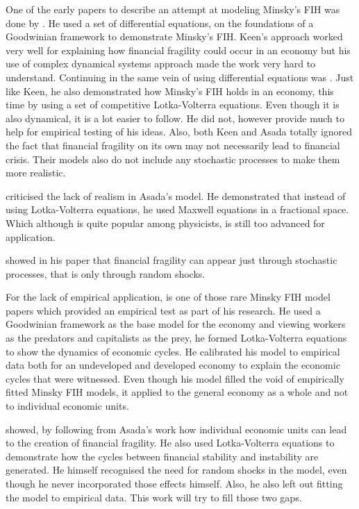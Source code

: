 \documentclass[12pt, a4paper]{article}
\begin{document}
	One of the early papers to describe an attempt at modeling Minsky's FIH was done by . He used a set of differential equations, on the foundations of a Goodwinian framework to demonstrate Minsky's FIH. Keen's approach worked very well for explaining how financial fragility could occur in an economy but his use of complex dynamical systems approach made the work very hard to understand. Continuing in the same vein of using differential equations was . Just like Keen, he also demonstrated how Minsky's FIH holds in an economy, this time by using a set of competitive Lotka-Volterra equations. Even though it is also dynamical, it is a lot easier to follow. He did not, however provide much to help for empirical testing of his ideas. Also, both Keen and Asada totally ignored the fact that financial fragility on its own may not necessarily lead to financial crisis. Their models also do not include any stochastic processes to make them more realistic. 
	
	 criticised the lack of realism in Asada's model. He demonstrated that instead of using Lotka-Volterra equations, he used Maxwell equations in a fractional space. Which although is quite popular among physicists, is still too advanced for application.%
	
	 showed in his paper that financial fragility can appear just through stochastic processes, that is only through random shocks.%
	
	For the lack of empirical application,  is one of those rare Minsky FIH model papers which provided an empirical test as part of his research. He used a Goodwinian framework as the base model for the economy and viewing workers as the predators and capitalists as the prey, he formed Lotka-Volterra equations to show the dynamics of economic cycles. He calibrated his model to empirical data both for an undeveloped and developed economy to explain the economic cycles that were witnessed. Even though his model filled the void of empirically fitted Minsky FIH models, it applied to the general economy as a whole and not to individual economic units.%
	
	 showed, by following from Asada's work how individual economic units can lead to the creation of financial fragility. He also used Lotka-Volterra equations to demonstrate how the cycles between financial stability and instability are generated. He himself recognised the need for random shocks in the model, even though he never incorporated those effects himself. Also, he also left out fitting the model to empirical data. This work will try to fill those two gaps.
	
\end{document}
